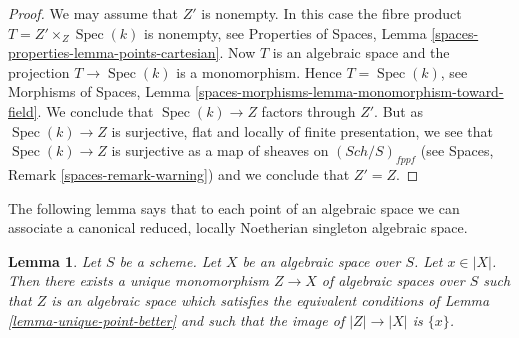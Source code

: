 \documentclass{stacks-project}
\theoremstyle{plain}
\newtheorem{lemma}[subsection]{Lemma}
\theoremstyle{definition}
\theoremstyle{remark}
\numberwithin{equation}{subsection}
\def\Spec{\mathop{\mathrm{Spec}}}
\def\Sch{\mathit{Sch}}
\begin{document}
\begin{proof}
We may assume that $Z'$ is nonempty. In this case the
fibre product $T = Z' \times_Z \Spec(k)$
is nonempty, see
Properties of Spaces, Lemma \ref{spaces-properties-lemma-points-cartesian}.
Now $T$ is an algebraic space and the projection $T \to \Spec(k)$
is a monomorphism. Hence $T = \Spec(k)$, see
Morphisms of Spaces, Lemma
\ref{spaces-morphisms-lemma-monomorphism-toward-field}.
We conclude that $\Spec(k) \to Z$ factors through $Z'$.
But as $\Spec(k) \to Z$ is surjective, flat and locally of finite
presentation, we see that $\Spec(k) \to Z$ is surjective as a
map of sheaves on $(\Sch/S)_{fppf}$ (see
Spaces, Remark \ref{spaces-remark-warning})
and we conclude that $Z' = Z$.
\end{proof}

\noindent
The following lemma says that to each point of an algebraic space we
can associate a canonical reduced, locally Noetherian singleton
algebraic space.

\begin{lemma}
\label{lemma-find-singleton-from-point}
Let $S$ be a scheme. Let $X$ be an algebraic space over $S$.
Let $x \in |X|$. Then there exists a unique monomorphism
$Z \to X$ of algebraic spaces
over $S$ such that $Z$ is an algebraic space which satisfies the equivalent
conditions of
Lemma \ref{lemma-unique-point-better}
and such that the image of $|Z| \to |X|$ is $\{x\}$.
\end{lemma}
\end{document}
